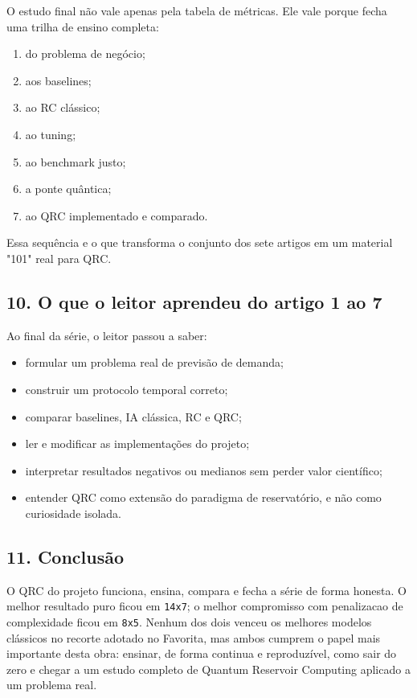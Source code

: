\documentclass[12pt]{article}
\providecommand{\tightlist}{%
  \setlength{\itemsep}{0pt}\setlength{\parskip}{0pt}}
\begin{document}
O estudo final não vale apenas pela tabela de métricas. Ele vale porque fecha uma trilha de ensino completa:

\begin{enumerate}
\def\labelenumi{\arabic{enumi}.}
\tightlist
\item
  do problema de negócio;
\item
  aos baselines;
\item
  ao RC clássico;
\item
  ao tuning;
\item
  ao benchmark justo;
\item
  a ponte quântica;
\item
  ao QRC implementado e comparado.
\end{enumerate}

Essa sequência e o que transforma o conjunto dos sete artigos em um material "101" real para QRC.

\subsection{10. O que o leitor aprendeu do artigo 1 ao 7}\label{10-o-que-o-leitor-aprendeu-do-artigo-1-ao-7}

Ao final da série, o leitor passou a saber:

\begin{itemize}
\tightlist
\item
  formular um problema real de previsão de demanda;
\item
  construir um protocolo temporal correto;
\item
  comparar baselines, IA clássica, RC e QRC;
\item
  ler e modificar as implementações do projeto;
\item
  interpretar resultados negativos ou medianos sem perder valor científico;
\item
  entender QRC como extensão do paradigma de reservatório, e não como curiosidade isolada.
\end{itemize}

\subsection{11. Conclusão}\label{11-conclusuxe3o}

O QRC do projeto funciona, ensina, compara e fecha a série de forma honesta. O melhor resultado puro ficou em \texttt{14x7}; o melhor compromisso com penalizacao de complexidade ficou em \texttt{8x5}. Nenhum dos dois venceu os melhores modelos clássicos no recorte adotado no Favorita, mas ambos cumprem o papel mais importante desta obra: ensinar, de forma continua e reproduzível, como sair do zero e chegar a um estudo completo de Quantum Reservoir Computing aplicado a um problema real.
\end{document}
